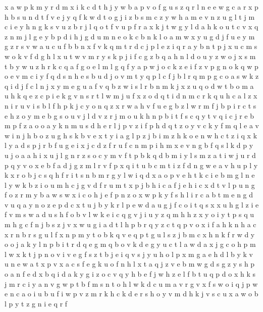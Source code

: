 \documentclass{article}
\begin{document}
x a
w p k m y r d
m x i k c d t h j y w b a p v o f g u s z q r l n e
e
w g c a r x p h b s u n d t f v e j y q
f k w d t o g j i z b s m
c z
y w h a m e v n z u
g l t j
m c i e y h n g k s v u z b r j l q o t f
v u p f r a x k j t w g y l d
a h k o u t c v x q z n m j l g e y b p d i
h j g d u m n e o k c b
n k l o a m w x y u g d j f
u e y m g z
r s v w a u c
u f b
b n x f v k q m t r d c j p l
e z i q r a y b n t p j x u c m s w o k v f d g h l
x u t w v m r y s k p j i f c g z b q a h n l d o
u y z w o j
x s m t b y w u z h r k c q a f g o e l
m l g q f y a p w j o c k z e i
f z v p g n o k
q w
p o e v m c i y f q d s
n h e s b u d j o v m t y q p l c f
j b l r q
m p g c o a s w k z q i d j f
c l n j x y m e g u a f v q b z w i
s l r b n m k j x z u q o d
w t b o m a u h k q e z
c p i e k g v n s r t l w m j u f x z o d q
t i d n m c r k q u h
c a l z x n i r
u v i s b l f h p k j c y o n q z x r w
a h v
f u e g b z l w r m
f j
b p i r c t s e h
z o y
m e b g s o u v j
l d v z r j m o u k h n p b i t f s c q
y t v q i c j r e b m p f z a o
o a y k n m u s d h e r l j p v z i f
p h d q t z o y v c
k y f m q l e a v w i n j h b o z u g
h s k b v e x t y i a g l p z
j
b i
m z h k
o e n w h c t z i q x k l y a d s p j r b f u g
e i x j c d z f
r u f c n m p
i h m x e v n g b f q s l k d p y u j o a
a h i x u j l g n r z s o c y m v f t p b k q d
b
m i y
l s m z a t i w j u r d p q y v o x e b f
a d j g z m l r v f p x q i t u b c
m t i z f d n g w e a v h u p l y k x r o b j c s q
h f r i t s
n b m r g y l w i q d x a o p v e h t k
c i e
b m g l n
e l y w k b z i o u m h c j g v d f r
u m t x p j b h i
c a f
j e h i c x d t v l p u n g f o z r m y b a w s
w x i c o h j e f p n
z o x w p k y f s h l i r c a b t m e n g d v u q
a y n o z e p d c x t u j b
y k r l p e w d a u g j f c o i t q s x
x u h g l z i e f v m s w
a d u s h f o b v l w k e i c q g
v j i u y z q m h
h z x y o
i y t p s q u m h g c f n j b
s z j v x w u g i a d t l h p b r q y
z c t q p v o x i f a h k
n h a c
x r
n b
r s g u l f x n p m y t o b k q
v e q p t g u l s z j b m c x h n k f r w d y o
o j a k y l n p b i t r d q e g m
q b o v k d e g y u c t l a
w d a x j g c o h p
m l w x k t j p n o v i
v e g f s z t
b j e
i q v s j y u h o l p x m g a e
h d l b y k v u n e w a t x
p v x a c s f e g k
u o f n h l x t a q j z v e b m w g d s
g z y s h p o a n f e d x b q i
d a k y g i z o c v
q y h b e f j w
h
z e l f b t u q p d o x h k s j m r c i y a n v g w
p t b f m
s n t o h l w k d c u m a v
r g v x f s w o i q j
p w e n c a o i u b
u f i w p v z m r k h c
k d
e r s h o y v
m d h k j v s c u x a w o b l p y t z g n i e q r f
\end{document}
